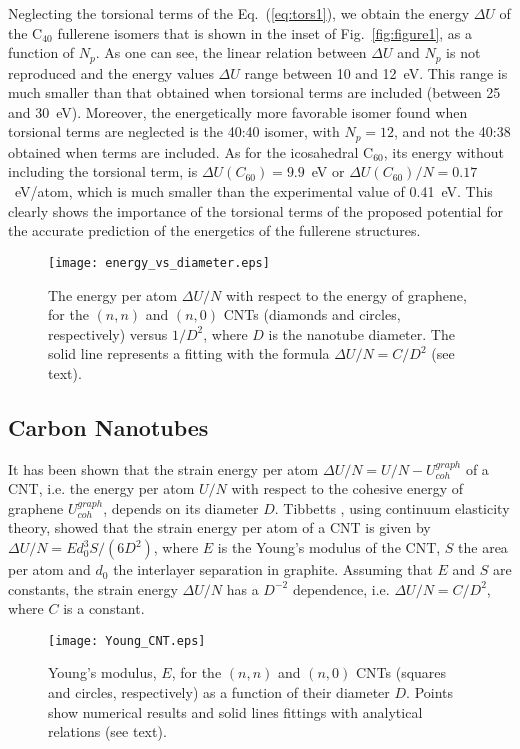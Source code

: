 \documentclass[aps,prb,floatfix,twocolumn,showpacs]{revtex4}
\begin{document}
Neglecting the torsional terms of the Eq.~(\ref{eq:tors1}), we obtain
the energy $\Delta U$ of the C$_{40}$ fullerene isomers that is shown in the inset of 
Fig.~\ref{fig:figure1}, as a function of $N_p$.
As one can see, the linear relation between $\Delta U$ and $N_p$ is not reproduced
and the energy values $\Delta U$ range between 10 and 12~eV. This range is much smaller than
that obtained when torsional terms are included (between 25 and 30~eV).
Moreover, the energetically more favorable isomer found when torsional terms are
neglected is the 40:40 isomer, with $N_p=12$, and not the 40:38 obtained when terms are 
included. As for the icosahedral 
C$_{60}$, its energy without including the torsional term, is $\Delta U(C_{60})=9.9$~eV or 
$\Delta U(C_{60})/N=0.17$~eV/atom, which is much smaller than the experimental value of 0.41~eV.
This clearly shows the importance of the torsional terms of the proposed potential
for the accurate prediction of the energetics of the fullerene structures.

\begin{figure}[!tb]
\texttt{[image: energy\_vs\_diameter.eps]}
\caption{The energy per atom $\Delta U/N$ with respect to the energy
of graphene, for the $(n,n)$ and $(n,0)$ CNTs (diamonds and circles, respectively) versus $1/D^2$, 
where $D$ is the nanotube diameter. The solid line represents a fitting with the formula $\Delta U/N=C/D^2$ (see text).}
\label{fig:figure2}
\end{figure}

\subsection{Carbon Nanotubes\label{sec:nanotubes}}

It has been shown that the strain energy per atom  $\Delta U/N=U/N-U^{graph}_{coh}$
of a  CNT, i.e. the energy per atom $U/N$ with respect 
to the cohesive energy of graphene $U^{graph}_{coh}$, depends on its diameter $D$. 
Tibbetts \cite{TIBBETTS}, using continuum elasticity
theory, showed that the strain energy per atom of a CNT is given by
$\Delta U/N = Ed_0^3S/(6D^2)$, where $E$ is the Young's modulus of the 
CNT, $S$ the area per atom and $d_0$ the interlayer separation in graphite.
Assuming that $E$ and $S$ are constants, the strain energy $\Delta U/N$ has 
a $D^{-2}$ dependence, i.e. $\Delta U/N=C/D^2$, where $C$ is a constant.

\begin{figure}[!tb]
\texttt{[image: Young\_CNT.eps]}
\caption{Young's modulus, $E$, for the $(n,n)$ and $(n,0)$ CNTs (squares and circles, respectively)
as a function of their diameter $D$. Points show numerical results and solid lines fittings with
analytical relations (see text).}
\label{fig:figure3}
\end{figure}
\end{document}
